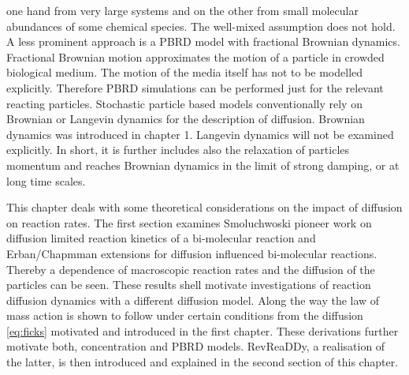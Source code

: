 \documentclass[
  a4paper,BCOR10mm,oneside,
  headsepline,footsepline,%
  fleqn,openbib
]{scrbook}
\begin{document}
one hand from very large systems and on the other from small molecular abundances of some chemical species. The well-mixed assumption does not hold.  A less prominent approach is a PBRD model with fractional Brownian dynamics. Fractional Brownian motion approximates the motion of a particle in crowded biological medium. The motion of the media itself has not to be modelled explicitly. Therefore PBRD simulations can be performed just for the relevant reacting particles. Stochastic particle based models conventionally rely on Brownian or Langevin dynamics for the description of diffusion. Brownian dynamics was introduced in chapter 1. Langevin dynamics will not be examined explicitly. In short, it is further includes also the relaxation of particles momentum and reaches Brownian dynamics in the limit of strong damping, or at long time scales.\par
This chapter deals with some theoretical considerations on the impact of diffusion on reaction rates. The first section examines Smoluchwoski pioneer work \cite{Smoluchowski1} on diffusion limited reaction kinetics of a bi-molecular reaction and Erban/Chapmman extensions \cite{Erban2009} for diffusion influenced bi-molecular reactions. Thereby a dependence of macroscopic reaction rates and the diffusion of the particles can be seen. These results shell motivate investigations of reaction diffusion dynamics with a different diffusion model. Along the way the law of mass action is shown to follow under certain conditions from the diffusion \cref{eq:ficks} motivated and introduced in the first chapter. These derivations further motivate both, concentration and PBRD models. RevReaDDy, a realisation of the latter, is then introduced and explained in the second section of this chapter.
\end{document}
